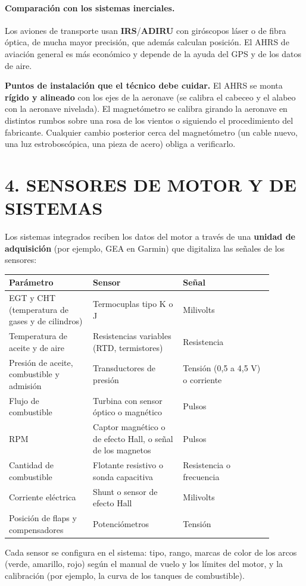 \paragraph*{Comparación con los sistemas inerciales.} Los aviones de transporte usan
\textbf{IRS}/\textbf{ADIRU} con giróscopos láser o de fibra óptica, de mucha mayor precisión, que
además calculan posición. El AHRS de aviación general es más económico y depende de la ayuda del
GPS y de los datos de aire.

\begin{recuadro}
\textbf{Puntos de instalación que el técnico debe cuidar.} El AHRS se monta \textbf{rígido y
alineado} con los ejes de la aeronave (se calibra el cabeceo y el alabeo con la aeronave nivelada).
El magnetómetro se calibra girando la aeronave en distintos rumbos sobre una rosa de los vientos o
siguiendo el procedimiento del fabricante. Cualquier cambio posterior cerca del magnetómetro (un
cable nuevo, una luz estroboscópica, una pieza de acero) obliga a verificarlo.
\end{recuadro}

\section*{4. SENSORES DE MOTOR Y DE SISTEMAS}

Los sistemas integrados reciben los datos del motor a través de una \textbf{unidad de adquisición}
(por ejemplo, GEA en Garmin) que digitaliza las señales de los sensores:
\begin{center}
\small
\begin{tabular}{|p{0.28\linewidth}|p{0.30\linewidth}|p{0.30\linewidth}|}
\hline
\textbf{Parámetro} & \textbf{Sensor} & \textbf{Señal} \\ \hline
EGT y CHT (temperatura de gases y de cilindros) & Termocuplas tipo K o J & Milivolts \\ \hline
Temperatura de aceite y de aire & Resistencias variables (RTD, termistores) & Resistencia \\ \hline
Presión de aceite, combustible y admisión & Transductores de presión & Tensión (0,5 a 4,5 V) o
corriente \\ \hline
Flujo de combustible & Turbina con sensor óptico o magnético & Pulsos \\ \hline
RPM & Captor magnético o de efecto Hall, o señal de los magnetos & Pulsos \\ \hline
Cantidad de combustible & Flotante resistivo o sonda capacitiva & Resistencia o frecuencia \\ \hline
Corriente eléctrica & Shunt o sensor de efecto Hall & Milivolts \\ \hline
Posición de flaps y compensadores & Potenciómetros & Tensión \\ \hline
\end{tabular}
\end{center}
Cada sensor se configura en el sistema: tipo, rango, marcas de color de los arcos (verde, amarillo,
rojo) según el manual de vuelo y los límites del motor, y la calibración (por ejemplo, la curva de
los tanques de combustible).

